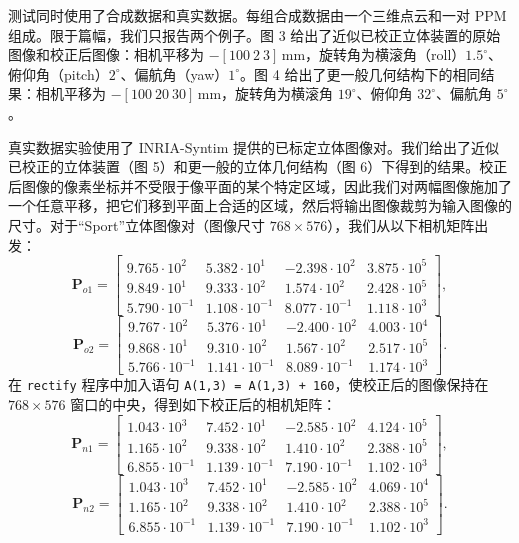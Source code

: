 \documentclass[a4paper,twocolumn,zihao=5,fontset=none,UTF8]{ctexart}
\newcommand{\sci}[2]{#1{\cdot}10^{#2}}
\begin{document}
测试同时使用了合成数据和真实数据。每组合成数据由一个三维点云和一对 PPM 组成。限于篇幅，我们只报告两个例子。图 3 给出了近似已校正立体装置的原始图像和校正后图像：相机平移为 $-[100\ 2\ 3]$\,mm，旋转角为横滚角（roll）$1.5^\circ$、俯仰角（pitch）$2^\circ$、偏航角（yaw）$1^\circ$。图 4 给出了更一般几何结构下的相同结果：相机平移为 $-[100\ 20\ 30]$\,mm，旋转角为横滚角 $19^\circ$、俯仰角 $32^\circ$、偏航角 $5^\circ$。

真实数据实验使用了 INRIA-Syntim 提供的已标定立体图像对。我们给出了近似已校正的立体装置（图 5）和更一般的立体几何结构（图 6）下得到的结果。校正后图像的像素坐标并不受限于像平面的某个特定区域，因此我们对两幅图像施加了一个任意平移，把它们移到平面上合适的区域，然后将输出图像裁剪为输入图像的尺寸。对于“Sport”立体图像对（图像尺寸 $768\times576$），我们从以下相机矩阵出发：
{\small\setlength{\arraycolsep}{3pt}
\begin{equation*}
  \mathbf{P}_{o1}\!=\!\begin{bmatrix}
    \sci{9.765}{2} & \sci{5.382}{1} & -\sci{2.398}{2} & \sci{3.875}{5}\\
    \sci{9.849}{1} & \sci{9.333}{2} & \sci{1.574}{2} & \sci{2.428}{5}\\
    \sci{5.790}{-1} & \sci{1.108}{-1} & \sci{8.077}{-1} & \sci{1.118}{3}
  \end{bmatrix}\!,
\end{equation*}
\begin{equation*}
  \mathbf{P}_{o2}\!=\!\begin{bmatrix}
    \sci{9.767}{2} & \sci{5.376}{1} & -\sci{2.400}{2} & \sci{4.003}{4}\\
    \sci{9.868}{1} & \sci{9.310}{2} & \sci{1.567}{2} & \sci{2.517}{5}\\
    \sci{5.766}{-1} & \sci{1.141}{-1} & \sci{8.089}{-1} & \sci{1.174}{3}
  \end{bmatrix}\!.
\end{equation*}}
在 \texttt{rectify} 程序中加入语句 \texttt{A(1,3) = A(1,3) + 160}，使校正后的图像保持在 $768\times576$ 窗口的中央，得到如下校正后的相机矩阵：
{\small\setlength{\arraycolsep}{3pt}
\begin{equation*}
  \mathbf{P}_{n1}\!=\!\begin{bmatrix}
    \sci{1.043}{3} & \sci{7.452}{1} & -\sci{2.585}{2} & \sci{4.124}{5}\\
    \sci{1.165}{2} & \sci{9.338}{2} & \sci{1.410}{2} & \sci{2.388}{5}\\
    \sci{6.855}{-1} & \sci{1.139}{-1} & \sci{7.190}{-1} & \sci{1.102}{3}
  \end{bmatrix}\!,
\end{equation*}
\begin{equation*}
  \mathbf{P}_{n2}\!=\!\begin{bmatrix}
    \sci{1.043}{3} & \sci{7.452}{1} & -\sci{2.585}{2} & \sci{4.069}{4}\\
    \sci{1.165}{2} & \sci{9.338}{2} & \sci{1.410}{2} & \sci{2.388}{5}\\
    \sci{6.855}{-1} & \sci{1.139}{-1} & \sci{7.190}{-1} & \sci{1.102}{3}
  \end{bmatrix}\!.
\end{equation*}}
\end{document}
